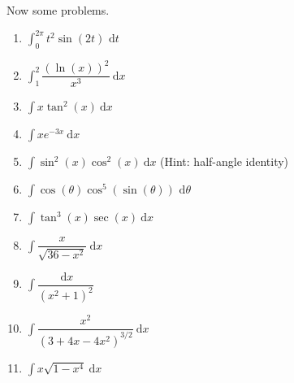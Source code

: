 \documentclass[10pt]{article}
\newcommand{\ds}{\displaystyle}
\newcommand{\dx}{\:\mathrm{d}x}
\theoremstyle{Theorem}
\theoremstyle{definition}
\theoremstyle{remark}
\theoremstyle{custom}
\begin{document}
Now some problems.
\begin{enumerate}[1.]
\item $\ds \int_0^{2\pi}t^2\sin(2t) \text{ d}t$
\item $\ds \int_1^2\dfrac{(\ln(x))^2}{x^3} \dx$
\item $\ds \int x\tan^2(x) \dx$
\item $\ds \int xe^{-3x}\dx$
\item $\ds \int \sin^2(x) \cos^2(x) \dx$ (Hint: half-angle identity)
\item $\ds \int \cos(\theta)\cos^5(\sin(\theta)) \text{ d}\theta$
\item $\ds \int \tan^3(x) \sec(x) \dx$
\item $\ds \int \dfrac{x}{\sqrt{36-x^2}}\dx$
\item $\ds \int \dfrac{\dx}{(x^2+1)^2}$
\item $\ds \int \dfrac{x^2}{(3+4x-4x^2)^{3/2}}\dx$
\item $\ds \int x\sqrt{1-x^4}\dx$

\end{enumerate}
\end{document}
